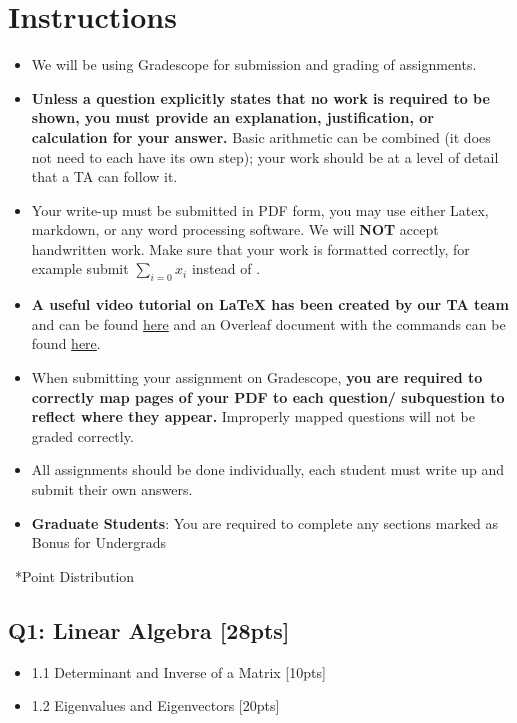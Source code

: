 \documentclass{article}
\begin{document}
\section*{Instructions}
\begin{itemize}
    \item We will be using Gradescope for submission and grading of assignments. 
    \item \textbf{Unless a question explicitly states that no work is required to be shown, you must provide an explanation, justification, or calculation for your answer.} Basic arithmetic can be combined (it does not need to each have its own step); your work should be at a level of detail that a TA can follow it.
    \item Your write-up must be submitted in PDF form, you may use either Latex,  markdown, or any word processing software. \color{red}We will \textbf{NOT} accept handwritten work. \color{black}Make sure that your work is formatted correctly, for example submit $\sum_{i=0} x_i$ instead of . 
    \item \textbf{A useful video tutorial on LaTeX has been created by our TA team} and can be found \href{https://www.dropbox.com/s/wywx114wtfoweru/Latex\%20Tutorial.mp4?dl=0}{here} and an Overleaf document with the commands can be found \href{https://www.overleaf.com/read/yjxbshkffvkm}{here}.

    \item When submitting your assignment on Gradescope, \textbf{you are required to correctly map pages of your PDF to each question/ subquestion to reflect where they appear.}  Improperly mapped questions will not be graded correctly.
    \item All assignments should be done individually, each student must write up and submit their own answers.
    \item \color{red}\textbf{Graduate Students}\color{black}: You are required to complete any sections marked as Bonus for Undergrads
\end{itemize}
\newpage

\ *{Point Distribution}
\subsection*{Q1: Linear Algebra [28pts]}
\begin{itemize}
    \item 1.1 Determinant and Inverse of a Matrix [10pts]
    \item 1.2 Eigenvalues and Eigenvectors [20pts]
\end{itemize}
\end{document}
